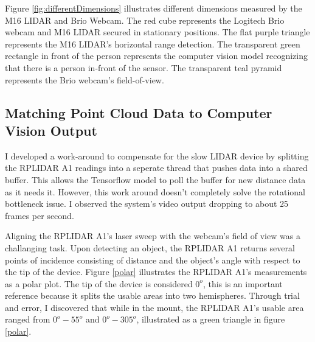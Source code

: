 \documentclass{article}
\begin{document}
  Figure \ref{fig:differentDimensions}  illustrates different dimensions measured by the M16 LIDAR and Brio Webcam.
  The red cube represents the Logitech Brio webcam and M16 LIDAR secured in stationary positions.
  The flat purple triangle represents the M16 LIDAR's horizontal range detection.
  The transparent green rectangle in front of the person represents the computer vision model recognizing that there is a person in-front of the sensor.
  The transparent teal pyramid represents the Brio webcam's field-of-view.


\subsection{Matching Point Cloud Data to Computer Vision Output}

  I developed a work-around to compensate for the slow LIDAR device by splitting the RPLIDAR A1 readings into a seperate thread that pushes data into a shared buffer.
  This allows the Tensorflow model to poll the buffer for new distance data as it needs it.
  However, this work around doesn't completely solve the rotational bottleneck issue. 
  I observed the system's video output dropping to about 25 frames per second.

  Aligning the RPLIDAR A1's laser sweep with the webcam's field of view was a challanging task.
  Upon detecting an object, the RPLIDAR A1 returns several points of incidence consisting of distance and the object's angle with respect to the tip of the device.
  Figure \ref{polar} illustrates the RPLIDAR A1's measurements as a polar plot.
  The tip of the device is considered \( 0^o \), this is an important reference because it splits the usable areas into two hemispheres.
  Through trial and error, I discovered that while in the mount, the RPLIDAR A1's usable area ranged from \( 0^o - 55^o\) and \( 0^o - 305^o\), illustrated as a green triangle in figure \ref{polar}.
\end{document}

